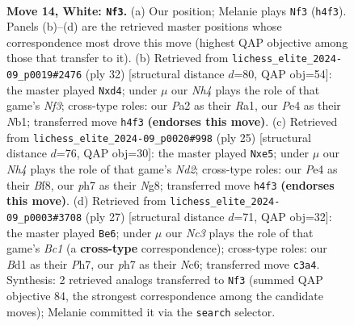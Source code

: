 \documentclass[11pt]{article}
\begin{document}
\begin{figure}[p]
\label{fig:thought-m24}
\end{figure}

\clearpage

\begin{figure}[p]\centering
\begin{subfigure}{0.46\textwidth}\centering
\resizebox{\linewidth}{!}{%
\newchessgame
\chessboard[
  setfen={rn3r2/pppb1kbp/5pp1/4p3/2P1P2N/2N1B3/PP3PP1/1R1BK2R w K - 4 14},
  showmover=false,
  pgfstyle=straightmove, color=movearrow, markmove={h4-f3}
]}
\caption{}
\end{subfigure}\hfill
\begin{subfigure}{0.46\textwidth}\centering
\resizebox{\linewidth}{!}{%
\newchessgame
\chessboard[
  setfen={r3kb1r/p3n2p/2p1bp2/6p1/n2pP3/P4N1P/5PP1/RNB1KB1R w KQkq - 0 17},
  showmover=false,
  pgfstyle=straightmove, color=movearrow, markmove={f3-d4}
]}
\caption{}
\end{subfigure}
\\[4pt]
\begin{subfigure}{0.46\textwidth}\centering
\resizebox{\linewidth}{!}{%
\newchessgame
\chessboard[
  setfen={1r2kbnr/1p1n1ppp/8/1Pp1P3/3p4/3P4/P2BPPBP/RN2K2R b KQk - 0 13},
  showmover=false,
  pgfstyle=straightmove, color=movearrow, markmove={d7-e5}
]}
\caption{}
\end{subfigure}\hfill
\begin{subfigure}{0.46\textwidth}\centering
\resizebox{\linewidth}{!}{%
\newchessgame
\chessboard[
  setfen={1rb1k2r/pp3ppp/2n2n2/1N2p3/4P3/1N3P2/PP1R1KPP/5B1R b k - 0 14},
  showmover=false,
  pgfstyle=straightmove, color=movearrow, markmove={c8-e6}
]}
\caption{}
\end{subfigure}
\caption{\textbf{Move 14, White: \texttt{Nf3}.} (a) Our position; Melanie plays \texttt{Nf3} (\texttt{h4f3}). Panels (b)--(d) are the retrieved master positions whose correspondence most drove this move (highest QAP objective among those that transfer to it). (b) Retrieved from \texttt{lichess\_elite\_2024-09\_p0019\#2476} (ply 32) [structural distance $d$=80, QAP obj=54]: the master played \texttt{Nxd4}; under $\mu$ our \emph{Nh4} plays the role of that game's \emph{Nf3}; cross-type roles: our \emph{P}a2 as their \emph{R}a1, our \emph{P}e4 as their \emph{N}b1; transferred move \texttt{h4f3} \textbf{(endorses this move)}. (c) Retrieved from \texttt{lichess\_elite\_2024-09\_p0020\#998} (ply 25) [structural distance $d$=76, QAP obj=30]: the master played \texttt{Nxe5}; under $\mu$ our \emph{Nh4} plays the role of that game's \emph{Nd2}; cross-type roles: our \emph{P}e4 as their \emph{B}f8, our \emph{p}h7 as their \emph{N}g8; transferred move \texttt{h4f3} \textbf{(endorses this move)}. (d) Retrieved from \texttt{lichess\_elite\_2024-09\_p0003\#3708} (ply 27) [structural distance $d$=71, QAP obj=32]: the master played \texttt{Be6}; under $\mu$ our \emph{Nc3} plays the role of that game's \emph{Bc1} (a \textbf{cross-type} correspondence); cross-type roles: our \emph{B}d1 as their \emph{P}h7, our \emph{p}h7 as their \emph{N}c6; transferred move \texttt{c3a4}. Synthesis: 2 retrieved analogs transferred to \texttt{Nf3} (summed QAP objective 84, the strongest correspondence among the candidate moves); Melanie committed it via the \texttt{search} selector.}

\end{figure}
\end{document}
